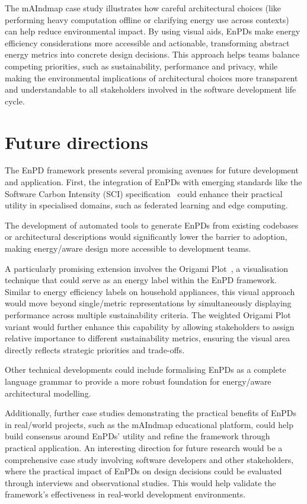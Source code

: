 \documentclass[11pt,a4paper]{article}
\begin{document}
The mAIndmap case study illustrates how careful architectural choices (like performing heavy computation offline or clarifying energy use across contexts) can help reduce environmental impact.
By using visual aids, EnPDs make energy efficiency considerations more accessible and actionable, transforming abstract energy metrics into concrete design decisions.
This approach helps teams balance competing priorities, such as sustainability, performance and privacy, while making the environmental implications of architectural choices more transparent and understandable to all stakeholders involved in the software development life cycle.

\section{Future directions}
The EnPD framework presents several promising avenues for future development and application.
First, the integration of EnPDs with emerging standards like the Software Carbon Intensity (SCI) specification~\cite{dodge2022measuring} could enhance their practical utility in specialised domains, such as federated learning and edge computing.

The development of automated tools to generate EnPDs from existing codebases or architectural descriptions would significantly lower the barrier to adoption, making energy\-/aware design more accessible to development teams.

A particularly promising extension involves the Origami Plot~\cite{duan2023origami}, a visualisation technique that could serve as an energy label within the EnPD framework.
Similar to energy efficiency labels on household appliances, this visual approach would move beyond single\-/metric representations by simultaneously displaying performance across multiple sustainability criteria.
The weighted Origami Plot variant would further enhance this capability by allowing stakeholders to assign relative importance to different sustainability metrics, ensuring the visual area directly reflects strategic priorities and trade-offs.

Other technical developments could include formalising EnPDs as a complete language grammar to provide a more robust foundation for energy\-/aware architectural modelling.

Additionally, further case studies demonstrating the practical benefits of EnPDs in real\-/world projects, such as the mAIndmap educational platform, could help build consensus around EnPDs' utility and refine the framework through practical application.
An interesting direction for future research would be a comprehensive case study involving software developers and other stakeholders, where the practical impact of EnPDs on design decisions could be evaluated through interviews and observational studies.
This would help validate the framework's effectiveness in real-world development environments.
\end{document}
